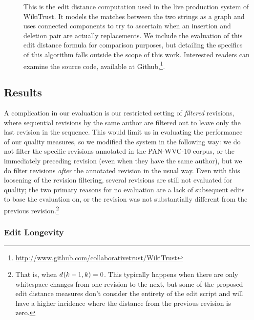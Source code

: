 \begin{description}
\item[] This is the edit distance computation used
    in the live production system of WikiTrust.
    It models the matches between the two strings as a graph and uses
    connected components to try to ascertain when an insertion and
    deletion pair are actually replacements.
    We include the evaluation of this edit distance formula for
    comparison purposes, but detailing the specifics of this algorithm
    falls outside the scope of this work.
    Interested readers can examine the source code, available at
    Github,\footnote{\url{http://www.github.com/collaborativetrust/WikiTrust}}.

\end{description}

\subsection{Results}

A complication in our evaluation is our restricted setting of
\textit{filtered} revisions, where sequential revisions by the
same author are filtered out to leave only the last revision
in the sequence.
This would limit us in evaluating the performance of our
quality measures, so we modified the system in the following way:
we do not filter the specific revisions annotated in the PAN-WVC-10 corpus,
or the immediately preceding revision (even when they have the
same author), but we do filter revisions \textit{after} the annotated
revision in the usual way.
Even with this loosening of the revision filtering, several
revisions are still not evaluated for quality; the two
primary reasons for no evaluation are a lack of subsequent
edits to base the evaluation on, or the revision was not
substantially different from the previous
revision.\footnote{That is, when $d_{}(k-1,k) = 0$.
This typically happens when there are only whitespace changes
from one revision to the next, but some of the proposed edit distance
measures don't consider the entirety of the edit script and
will have a higher incidence where the distance from the
previous revision is zero.}

\subsubsection{Edit Longevity}



